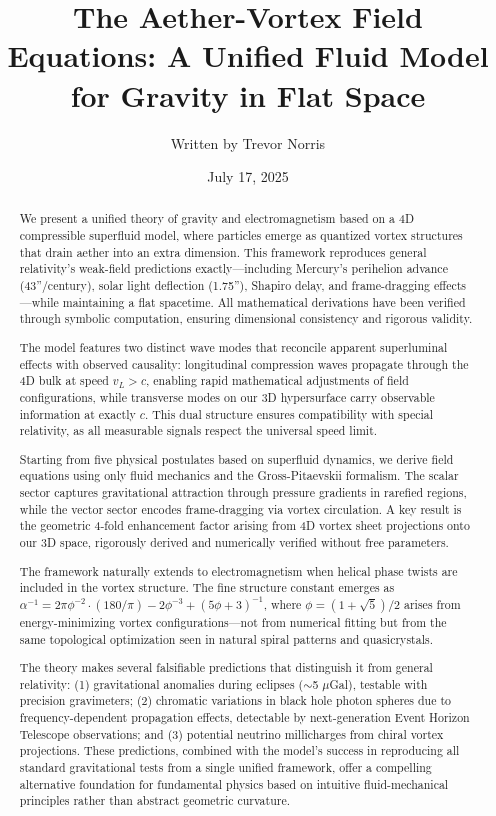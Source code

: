 \documentclass{article}
\title{The Aether-Vortex Field Equations: A Unified Fluid Model for Gravity in Flat Space}
\author{Written by Trevor Norris}
\date{July 17, 2025}
\begin{document}
\maketitle

\begin{abstract}
We present a unified theory of gravity and electromagnetism based on a 4D compressible superfluid model, where particles emerge as quantized vortex structures that drain aether into an extra dimension. This framework reproduces general relativity's weak-field predictions exactly---including Mercury's perihelion advance (43''/century), solar light deflection (1.75''), Shapiro delay, and frame-dragging effects---while maintaining a flat spacetime. All mathematical derivations have been verified through symbolic computation, ensuring dimensional consistency and rigorous validity.

The model features two distinct wave modes that reconcile apparent superluminal effects with observed causality: longitudinal compression waves propagate through the 4D bulk at speed $v_L > c$, enabling rapid mathematical adjustments of field configurations, while transverse modes on our 3D hypersurface carry observable information at exactly $c$. This dual structure ensures compatibility with special relativity, as all measurable signals respect the universal speed limit.

Starting from five physical postulates based on superfluid dynamics, we derive field equations using only fluid mechanics and the Gross-Pitaevskii formalism. The scalar sector captures gravitational attraction through pressure gradients in rarefied regions, while the vector sector encodes frame-dragging via vortex circulation. A key result is the geometric 4-fold enhancement factor arising from 4D vortex sheet projections onto our 3D space, rigorously derived and numerically verified without free parameters.

The framework naturally extends to electromagnetism when helical phase twists are included in the vortex structure. The fine structure constant emerges as $\alpha^{-1} = 2\pi \phi^{-2} \cdot (180/\pi) - 2\phi^{-3} + (5\phi + 3)^{-1}$, where $\phi = (1 + \sqrt{5})/2$ arises from energy-minimizing vortex configurations---not from numerical fitting but from the same topological optimization seen in natural spiral patterns and quasicrystals.

The theory makes several falsifiable predictions that distinguish it from general relativity: (1) gravitational anomalies during eclipses ($\sim$5 $\mu$Gal), testable with precision gravimeters; (2) chromatic variations in black hole photon spheres due to frequency-dependent propagation effects, detectable by next-generation Event Horizon Telescope observations; and (3) potential neutrino millicharges from chiral vortex projections. These predictions, combined with the model's success in reproducing all standard gravitational tests from a single unified framework, offer a compelling alternative foundation for fundamental physics based on intuitive fluid-mechanical principles rather than abstract geometric curvature.
\end{abstract}
\end{document}
